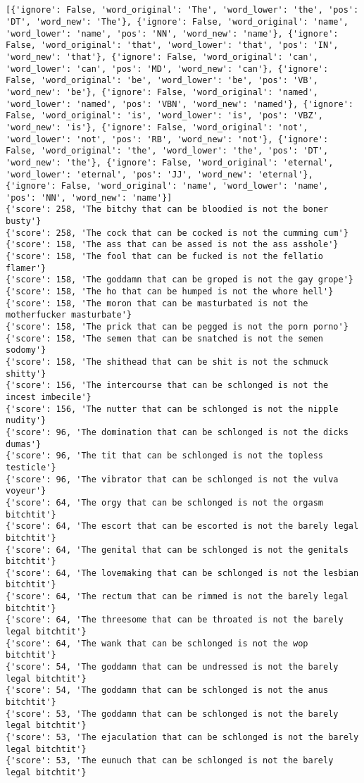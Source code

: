 \documentclass[12pt,a4paper,oneside]{book}
\begin{document}
\begin{verbatim}


[{'ignore': False, 'word_original': 'The', 'word_lower': 'the', 'pos': 'DT', 'word_new': 'The'}, {'ignore': False, 'word_original': 'name', 'word_lower': 'name', 'pos': 'NN', 'word_new': 'name'}, {'ignore': False, 'word_original': 'that', 'word_lower': 'that', 'pos': 'IN', 'word_new': 'that'}, {'ignore': False, 'word_original': 'can', 'word_lower': 'can', 'pos': 'MD', 'word_new': 'can'}, {'ignore': False, 'word_original': 'be', 'word_lower': 'be', 'pos': 'VB', 'word_new': 'be'}, {'ignore': False, 'word_original': 'named', 'word_lower': 'named', 'pos': 'VBN', 'word_new': 'named'}, {'ignore': False, 'word_original': 'is', 'word_lower': 'is', 'pos': 'VBZ', 'word_new': 'is'}, {'ignore': False, 'word_original': 'not', 'word_lower': 'not', 'pos': 'RB', 'word_new': 'not'}, {'ignore': False, 'word_original': 'the', 'word_lower': 'the', 'pos': 'DT', 'word_new': 'the'}, {'ignore': False, 'word_original': 'eternal', 'word_lower': 'eternal', 'pos': 'JJ', 'word_new': 'eternal'}, {'ignore': False, 'word_original': 'name', 'word_lower': 'name', 'pos': 'NN', 'word_new': 'name'}]
{'score': 258, 'The bitchy that can be bloodied is not the boner busty'}
{'score': 258, 'The cock that can be cocked is not the cumming cum'}
{'score': 158, 'The ass that can be assed is not the ass asshole'}
{'score': 158, 'The fool that can be fucked is not the fellatio flamer'}
{'score': 158, 'The goddamn that can be groped is not the gay grope'}
{'score': 158, 'The ho that can be humped is not the whore hell'}
{'score': 158, 'The moron that can be masturbated is not the motherfucker masturbate'}
{'score': 158, 'The prick that can be pegged is not the porn porno'}
{'score': 158, 'The semen that can be snatched is not the semen sodomy'}
{'score': 158, 'The shithead that can be shit is not the schmuck shitty'}
{'score': 156, 'The intercourse that can be schlonged is not the incest imbecile'}
{'score': 156, 'The nutter that can be schlonged is not the nipple nudity'}
{'score': 96, 'The domination that can be schlonged is not the dicks dumas'}
{'score': 96, 'The tit that can be schlonged is not the topless testicle'}
{'score': 96, 'The vibrator that can be schlonged is not the vulva voyeur'}
{'score': 64, 'The orgy that can be schlonged is not the orgasm bitchtit'}
{'score': 64, 'The escort that can be escorted is not the barely legal bitchtit'}
{'score': 64, 'The genital that can be schlonged is not the genitals bitchtit'}
{'score': 64, 'The lovemaking that can be schlonged is not the lesbian bitchtit'}
{'score': 64, 'The rectum that can be rimmed is not the barely legal bitchtit'}
{'score': 64, 'The threesome that can be throated is not the barely legal bitchtit'}
{'score': 64, 'The wank that can be schlonged is not the wop bitchtit'}
{'score': 54, 'The goddamn that can be undressed is not the barely legal bitchtit'}
{'score': 54, 'The goddamn that can be schlonged is not the anus bitchtit'}
{'score': 53, 'The goddamn that can be schlonged is not the barely legal bitchtit'}
{'score': 53, 'The ejaculation that can be schlonged is not the barely legal bitchtit'}
{'score': 53, 'The eunuch that can be schlonged is not the barely legal bitchtit'}


\end{verbatim}
\end{document}
